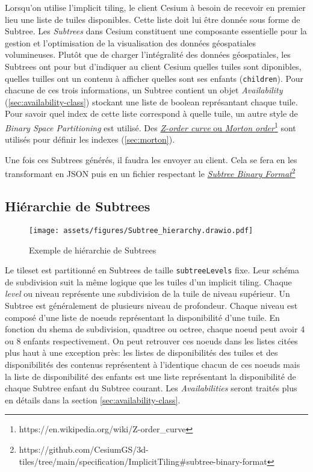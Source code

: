 Lorsqu'on utilise l'implicit tiling, le client Cesium à besoin de recevoir en premier lieu une liste de tuiles disponibles. Cette liste doit lui être donnée sous forme de Subtree. Les \textit{Subtrees} dans Cesium constituent une composante essentielle pour la gestion et l'optimisation de la visualisation des données géospatiales volumineuses. Plutôt que de charger l'intégralité des données géospatiales, les Subtrees ont pour but d'indiquer au client Cesium quelles tuiles sont diponibles, quelles tuilles ont un contenu à afficher quelles sont ses enfants (\texttt{children}). Pour chacune de ces trois informations, un Subtree contient un objet \textit{Availability} (\autoref{sec:availability-class}) stockant une liste de boolean représantant chaque tuile. Pour savoir quel index de cette liste correspond à quelle tuile, un autre style de \textit{Binary Space Partitioning} est utilisé. Des \href{https://en.wikipedia.org/wiki/Z-order\_curve}{\textit{Z-order curve} ou \textit{Morton order}}\footnote{https://en.wikipedia.org/wiki/Z-order\_curve} sont utilisés pour définir les indexes (\autoref{sec:morton}).

Une fois ces Subtrees générés, il faudra les envoyer au client. Cela se fera en les transformant en JSON puis en un fichier respectant le \href{https://github.com/CesiumGS/3d-tiles/tree/main/specification/ImplicitTiling\#subtree-binary-format}{\textit{Subtree Binary Format}}\footnote{https://github.com/CesiumGS/3d-tiles/tree/main/specification/ImplicitTiling\#subtree-binary-format}

\subsection*{Hiérarchie de Subtrees}

\begin{figure}[H]
    \centering
    \texttt{[image: assets/figures/Subtree\_hierarchy.drawio.pdf]}
    \caption{Exemple de hiérarchie de Subtrees}
    \label{fig:subtree-hierarchy}
\end{figure}

Le tileset est partitionné en Subtrees de taille \texttt{subtreeLevels} fixe. Leur schéma de subdivision suit la même logique que les tuiles d'un implicit tiling. Chaque \textit{level} ou niveau représente une subdivision de la tuile de niveau supérieur. Un Subtree est généralement de plusieurs niveau de profondeur. Chaque niveau est composé d'une liste de noeuds représentant la disponibilité d'une tuile. En fonction du shema de subdivision, quadtree ou octree, chaque noeud peut avoir 4 ou 8 enfants respectivement. On peut retrouver ces noeuds dans les listes citées plus haut à une exception près: les listes de disponibilités des tuiles et des disponibilités des contenus représentent à l'identique chacun de ces noeuds mais la liste de disponibilité des enfants est une liste représentant la disponibilité de chaque Subtree enfant du Subtree courant. Les \textit{Availabilities} seront traités plus en détails dans la section \ref{sec:availability-class}.

